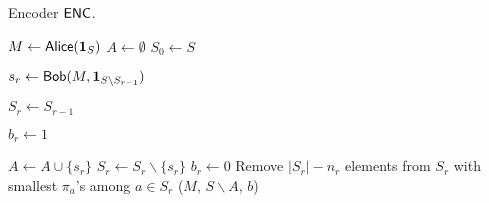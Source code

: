 \begin{algorithm}[H] 
  \caption{Encoder $\textsf{ENC}$.} \label{algo:enc}
  \begin{algorithmic}[1]
    \State $M \leftarrow \mathsf{Alice}(\mathbf{1}_S)$
    \State $A\leftarrow \emptyset$       
    \State $S_0 \leftarrow S$   
    \begin{flushright} \end{flushright}
      \State $s_r\leftarrow \mathsf{Bob}(M, \mathbf{1}_{S\backslash S_{r-1}})$       
         \begin{flushright} \end{flushright}
       
       
      \State $S_r\leftarrow S_{r-1}$
        \begin{flushright}\end{flushright}
        \State $b_r\leftarrow 1$       
        \begin{flushright}\end{flushright}
        \State $A\leftarrow A \cup \{s_r\}$
        \State $S_r\leftarrow S_r \backslash \{s_r\}$
      \Else 
        \State $b_r\leftarrow 0$
      \EndIf
      \State Remove $|S_r|-n_r$ elements from $S_r$ with smallest $\pi_a$'s among $a\in S_r$       
    \EndFor
    \State \Return ($M$, $S\backslash A$, $b$) 
    \EndProcedure
  \end{algorithmic}
\end{algorithm}


